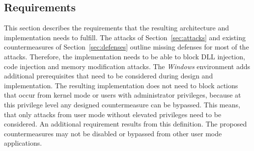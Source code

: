 \subsection{Requirements}
This section describes the requirements that the resulting architecture and implementation needs to fulfill. The attacks of Section~\ref{sec:attacks} and existing countermeasures of Section~\ref{sec:defenses} outline missing defenses for most of the attacks. Therefore, the implementation needs to be able to block \gls{DLL} injection, code injection and memory modification attacks. The \emph{Windows} environment adds additional prerequisites that need to be considered during design and implementation. The resulting implementation does not need to block actions that occur from kernel mode or users with administrator privileges, because at this privilege level any designed countermeasure can be bypassed. This means, that only attacks from user mode without elevated privileges need to be considered. An additional requirement results from this definition. The proposed countermeasures may not be disabled or bypassed from other user mode applications.